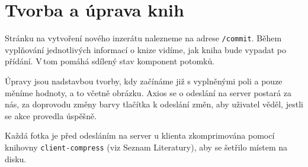 \documentclass[a4paper,oneside,12pt]{report}
\begin{document}
\section{Tvorba a úprava knih}
Stránku na vytvoření nového inzerátu nalezneme na adrese \texttt{/commit}. Během
vyplňování jednotlivých informací o knize vidíme, jak kniha bude vypadat po přídání.
V\,tom pomáhá sdílený stav komponent potomků.

Úpravy jsou nadstavbou tvorby, kdy začínáme již s vyplněnými poli a pouze měníme hodnoty,
a to včetně obrázku. Axios se o odeslání na server postará za nás, za doprovodu změny
barvy tlačítka k odeslání změn, aby uživatel věděl, jestli se akce provedla úspěšně.

Každá fotka je před odesláním na server u klienta zkomprimována pomocí knihovny
\texttt{client-compress} (viz Seznam Literatury), aby se šetřilo místem na disku.
\end{document}
